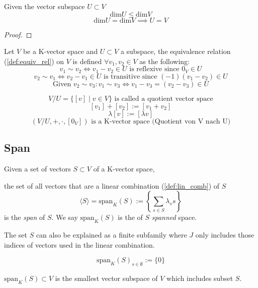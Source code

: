 \begin{lemma}
   Given the vector subspace \(U \subset V\)
   \[\text{dim}U \leq \text{dim}V\]
   \[\text{dim}U = \text{dim}V \implies U = V\]
\end{lemma}
\begin{proof}
\end{proof}

\begin{definition}
   Let \(V\) be a K-vector space and \(U \subset V\) a subspace, the equivalence relation (\ref{def:equiv_rel}) on \(V\) is defined \(\forall v_1, v_2 \in V\) as the following:
   \[v_1 \sim v_2 \iff v_1 - v_2 \in U \text{ is reflexive since } 0_V \in U\]
   \[v_2 \sim v_1 \iff v_2 - v_1 \in U \text{ is transitive since } (-1)(v_1 - v_2) \in U\]
   \[\text{Given } v_2 \sim v_3: v_1 \sim v_3 \iff v_1 - v_3 = (v_2 - v_3) \in U\]

   \[V/U = \{[v] \mid v \in V\} \text{ is called a quotient vector space}\]
   \[[v_1] + [v_2] := [v_1 + v_2]\]
   \[\lambda [v] := [\lambda v]\]
   \[(V/U, +, \cdot, [0_V]) \text{ is a K-vector space (Quotient von V nach U)}\]
\end{definition}

\subsection{Span}
\begin{definition}[Span]
   Given a set of vectors \(S \subset V\) of a K-vector space,

   the set of all vectors that are a linear combination (\ref{def:lin_comb}) of \(S\) 
   \[\langle S\rangle = \text{span}_{K}(S) := \left\{\sum_{s \in S} \lambda_s s \right\}\]
   is the \textit{span} of \(S\).
   We say \(\text{span}_{K}(S)\) is the of \(S\) \textit{spanned} space.
\end{definition}
\begin{remark}
   The set \(S\) can also be explained as a finite subfamily where \(J\) only includes those indices of vectors used in the linear combination.
\end{remark}

\begin{definition}
   \[\text{span}_{K}(S)_{s \in \emptyset} := \{0\}\]
\end{definition}

\(\text{span}_{K}(S) \subset V\) is the smallest vector subspace of \(V\) which includes subset \(S\).

